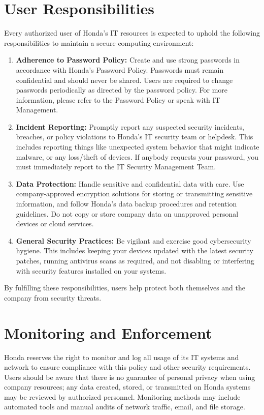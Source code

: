 \section{User Responsibilities}
Every authorized user of Honda's IT resources is expected to uphold the following responsibilities to maintain a secure computing environment:
\begin{enumerate}
    \item \textbf{Adherence to Password Policy:} Create and use strong passwords in accordance with Honda's Password Policy. Passwords must remain confidential and should never be shared. Users are required to change passwords periodically as directed by the password policy. For more information, please refer to the Password Policy or speak with IT Management. 
    \item \textbf{Incident Reporting:} Promptly report any suspected security incidents, breaches, or policy violations to Honda's IT security team or helpdesk. This includes reporting things like unexpected system behavior that might indicate malware, or any loss/theft of devices. If anybody requests your password, you must immediately report to the IT Security Management Team.
    \item \textbf{Data Protection:} Handle sensitive and confidential data with care. Use company-approved encryption solutions for storing or transmitting sensitive information, and follow Honda's data backup procedures and retention guidelines. Do not copy or store company data on unapproved personal devices or cloud services.
    \item \textbf{General Security Practices:} Be vigilant and exercise good cybersecurity hygiene. This includes keeping your devices updated with the latest security patches, running antivirus scans as required, and not disabling or interfering with security features installed on your systems.
\end{enumerate}
By fulfilling these responsibilities, users help protect both themselves and the company from security threats.

\section{Monitoring and Enforcement}
Honda reserves the right to monitor and log all usage of its IT systems and network to ensure compliance with this policy and other security requirements. Users should be aware that there is no guarantee of personal privacy when using company resources; any data created, stored, or transmitted on Honda systems may be reviewed by authorized personnel. Monitoring methods may include automated tools and manual audits of network traffic, email, and file storage.

